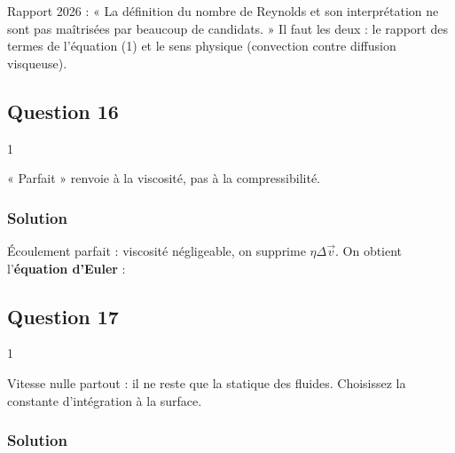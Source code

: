 \documentclass[11pt,a4paper]{article}
\newcommand{\equationajustee}[1]{%
  \sbox{\boiteequation}{$\displaystyle #1$}%
  \ifdim\wd\boiteequation>\linewidth
    \[\resizebox{\linewidth}{!}{\usebox{\boiteequation}}\]%
  \else
    \[#1\]%
  \fi}
\begin{document}
\begin{jury}

Rapport 2026 : « La définition du nombre de Reynolds et son interprétation ne sont pas maîtrisées par beaucoup de candidats. » Il faut les deux : le rapport des termes de l'équation (1) et le sens physique (convection contre diffusion visqueuse).

\end{jury}

\hypertarget{question-16}{%
\subsection{Question 16}\label{question-16}}

\begin{indication}{1}

« Parfait » renvoie à la viscosité, pas à la compressibilité.

\end{indication}

\hypertarget{solution-15}{%
\subsubsection{Solution}\label{solution-15}}

Écoulement parfait : viscosité négligeable, on supprime \(\eta\Delta\vec v\). On obtient l'\textbf{équation d'Euler} :

\equationajustee{\boxed{\rho\left(\frac{\partial\vec v}{\partial t}+(\vec v\cdot\overrightarrow{\operatorname{grad}})\vec v\right)=\rho\vec g-\overrightarrow{\operatorname{grad}}\,P}}

\hypertarget{question-17}{%
\subsection{Question 17}\label{question-17}}

\begin{indication}{1}

Vitesse nulle partout : il ne reste que la statique des fluides. Choisissez la constante d'intégration à la surface.

\end{indication}

\hypertarget{solution-16}{%
\subsubsection{Solution}\label{solution-16}}
\end{document}
